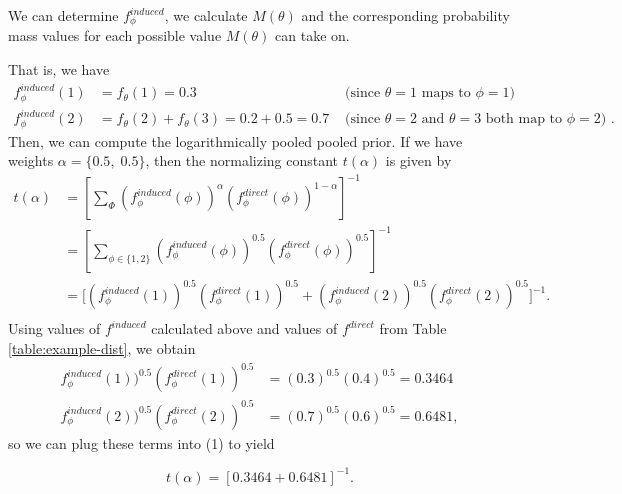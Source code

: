 \documentclass[12pt,twoside]{smiththesis}
\begin{document}
We can determine \(f_\phi^{induced}\), we calculate \(M(\theta)\) and the corresponding probability mass values for each possible value \(M(\theta)\) can take on.

That is, we have
\begin{align*}
f_\phi^{induced}(1) &= f_{\theta}(1) = 0.3 & \text{ (since $\theta = 1$ maps to $\phi = 1$) } \\
f_\phi^{induced}(2) &= f_{\theta}(2) +  f_{\theta}(3) = 0.2 + 0.5=  0.7 & \text{ (since $\theta = 2$ and $\theta=3$ both map to $\phi = 2$) .}
\end{align*}
Then, we can compute the logarithmically pooled pooled prior. If we have weights \(\alpha=\{0.5,\;0.5\}\), then the normalizing constant \(t(\alpha)\) is given by
\begin{align*} 
t(\alpha) &= \left[ \sum_\Phi  (f_\phi^{induced}(\phi))^{\alpha} (f_\phi^{direct}(\phi))^{1-\alpha} \right]^{-1} \\
&=  \left[ \sum_{\phi \in \{1,2\}}  (f_\phi^{induced}(\phi))^{0.5} (f_\phi^{direct}(\phi))^{0.5} \right]^{-1} \\
&= \Big[ (f_\phi^{induced}(1))^{0.5} (f_\phi^{direct}(1))^{0.5} + (f_\phi^{induced}(2))^{0.5} (f_\phi^{direct}(2))^{0.5} \Big]^{-1} . \tag{1}\\
\end{align*}
\noindent Using values of \(f^{induced}\) calculated above and values of \(f^{direct}\) from Table \ref{table:example-dist}, we obtain
\begin{align*}
f_\phi^{induced}(1))^{0.5} (f_\phi^{direct}(1))^{0.5}&= (0.3)^{0.5}(0.4)^{0.5} =0.3464\\
f_\phi^{induced}(2))^{0.5} (f_\phi^{direct}(2))^{0.5} &= (0.7)^{0.5} (0.6)^{0.5}=0.6481,
\end{align*}
\noindent so we can plug these terms into (1) to yield

\[ t(\alpha) = [0.3464 +0.6481 ]^{-1}. \]
\end{document}
